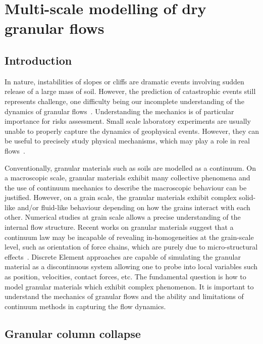 \chapter{Multi-scale modelling of dry granular flows}

\ifpdf
    \graphicspath{{Chapter4/figs/raster/}{Chapter4/figs/pdf/}{Chapter4/figs/}}
\else
    \graphicspath{{Chapter4/figs/vector/}{Chapter4/figs/}}
\fi

\section{Introduction}

In nature, instabilities of slopes or cliffs are dramatic events involving 
sudden release of a large mass of soil. However, the prediction of catastrophic 
events still represents  challenge, one difficulty being our incomplete 
understanding of the dynamics of granular flows~\citep{Rondon2011}.  
Understanding the mechanics is of particular importance for risks assessment. 
Small scale laboratory experiments are usually unable to properly capture the 
dynamics of geophysical events. However, they can be useful to precisely study 
physical mechanisms, which may play a role in real flows~\citep{Iverson1997}. 

Conventionally, granular materials such as soils are modelled as a continuum. 
On a macroscopic scale, granular materials exhibit many collective phenomena 
and the use of continuum mechanics to describe the macroscopic behaviour can be 
justified. However, on a grain scale, the granular materials exhibit complex 
solid-like and/or fluid-like behaviour depending on how the grains interact 
with each other. Numerical studies at grain scale allows a precise 
understanding of the internal flow structure. Recent works on granular 
materials suggest that a continuum law may be incapable of revealing 
in-homogeneities at the grain-scale level, such as orientation of force chains, 
which are purely due to micro-structural effects~\cite{Rycroft2009a}. Discrete 
Element approaches are capable of simulating the granular material as a 
discontinuous system allowing one to probe into local variables such as 
position, velocities, contact forces, etc. The fundamental question is how to 
model granular materials which exhibit complex phenomenon. It is important to 
understand the mechanics of granular flows and the ability and limitations of 
continuum methods in capturing the flow dynamics.


\section{Granular column collapse}

